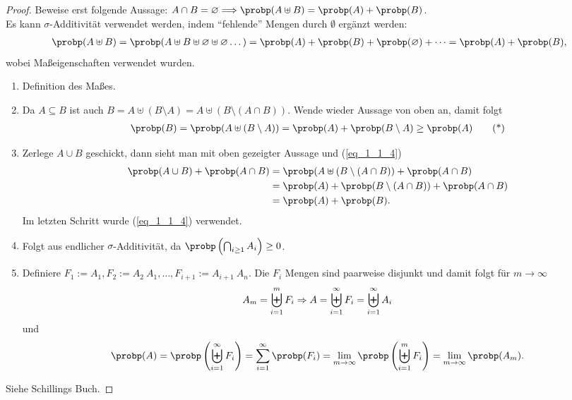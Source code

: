 \begin{proof}
	Beweise erst folgende Aussage: $A\cap B = \emptyset \Longrightarrow \probp(A \uplus B) = \probp(A) + \probp(B)$.\\
	Es kann $\sigma$-Additivität verwendet werden, indem ``fehlende'' Mengen durch $\emptyset$ ergänzt werden:
	\begin{align}
		\probp(A \uplus B) = \probp(A \uplus B \uplus \emptyset \uplus \emptyset \dots) = \probp(A) + \probp(B) + \probp(\emptyset) + \dots = \probp(A) + \probp(B),\notag
	\end{align}
	wobei Maßeigenschaften verwendet wurden.
	\begin{enumerate}
		\item Definition des Maßes.
		\item Da $A \subseteq B$ ist auch $B = A \uplus (B \setminus A) = A \uplus (B \setminus (A \cap B))$. Wende wieder Aussage von oben an, damit folgt
		\begin{align}
			\probp(B) = \probp(A \uplus (B \setminus A)) = \probp(A) + \probp(B \setminus A) \ge \probp(A) \label{eq_1_1_4}\tag{*}
		\end{align}
		\item Zerlege $A \cup B$ geschickt, dann sieht man mit oben gezeigter Aussage und (\ref{eq_1_1_4})
		\begin{align}
			\probp(A \cup B) + \probp(A \cap B) &= \probp(A \uplus (B \setminus (A \cap B)) + \probp(A \cap B)\notag \\
			&= \probp(A) + \probp(B \setminus (A \cap B)) + \probp(A \cap B)\notag\\
			&= \probp(A)+\probp(B).\notag	
		\end{align}
		Im letzten Schritt wurde (\ref{eq_1_1_4}) verwendet.
		\item Folgt aus endlicher $\sigma$-Additivität, da $\probp\left(\bigcap_{i\ge 1} A_i \right) \ge 0$.
		\item Definiere $F_1 := A_1, F_2 := A_2 \ A_1, \dots, F_{i+1} := A_{i+1}\ A_n$. Die $F_i$ Mengen sind paarweise disjunkt und damit folgt für $m \to \infty$
		\begin{align}
			A_m = \biguplus_{i=1}^{m} F_i \Rightarrow A = \biguplus_{i=1}^{\infty} F_i = \biguplus_{i=1}^{\infty} A_i\notag
		\end{align}
		und
		\begin{align}
			\probp(A) = \probp\left( \biguplus_{i=1}^{\infty} F_i \right) = \sum_{i=1}^{\infty} \probp(F_i) = \lim\limits_{m \to \infty} \probp\left( \biguplus_{i=1}^{m} F_i \right) = \lim\limits_{m\to \infty} \probp(A_m). \notag
		\end{align}
	\end{enumerate}
	Siehe Schillings Buch. %
\end{proof}

